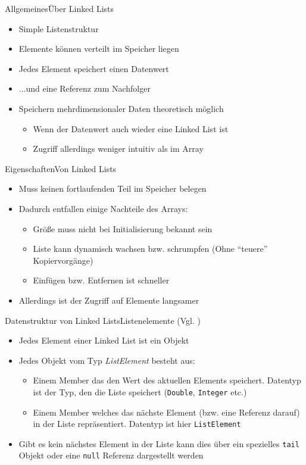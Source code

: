 \begin{frame}{Allgemeines}{Über Linked Lists}
	\begin{itemize}
		\item Simple Listenstruktur
		\item Elemente können verteilt im Speicher liegen
		\item Jedes Element speichert einen Datenwert
		\item ...und eine Referenz zum Nachfolger
		\item Speichern mehrdimensionaler Daten theoretisch möglich
		\begin{itemize}
			\item Wenn der Datenwert auch wieder eine Linked List ist
			\item Zugriff allerdings weniger intuitiv als im Array
		\end{itemize}
	\end{itemize}
\end{frame}


\begin{frame}{Eigenschaften}{Von Linked Lists}
	\begin{itemize}
		\item Muss keinen fortlaufenden Teil im Speicher belegen
		\item Dadurch entfallen einige Nachteile des Arrays:
		\begin{itemize}
			\item Größe muss nicht bei Initialisierung bekannt sein
			\item Liste kann dynamisch wachsen bzw. schrumpfen (Ohne "`teuere"' Kopiervorgänge)
			\item Einfügen bzw. Entfernen ist schneller
		\end{itemize}
		\item Allerdings ist der Zugriff auf Elemente langsamer
	\end{itemize}
\end{frame}

\begin{frame}{Datenstruktur von Linked Lists}{Listenelemente (Vgl. \cite{fahr:list})}
	\begin{itemize}
		\item Jedes Element einer Linked List ist ein Objekt
		\item Jedes Objekt vom Typ \textit{ListElement} besteht aus:
		\begin{itemize}
			\item Einem Member das den Wert des aktuellen Elements speichert. Datentyp ist der Typ, den die Liste speichert (\texttt{Double}, \texttt{Integer} etc.)
			\item Einem Member welches das nächste Element (bzw. eine Referenz darauf) in der Liste repräsentiert. Datentyp ist hier \texttt{ListElement}
		\end{itemize}
		\item Gibt es kein nächstes Element in der Liste kann dies über ein spezielles \texttt{tail} Objekt oder eine \texttt{null} Referenz dargestellt werden
	\end{itemize}
\end{frame}

